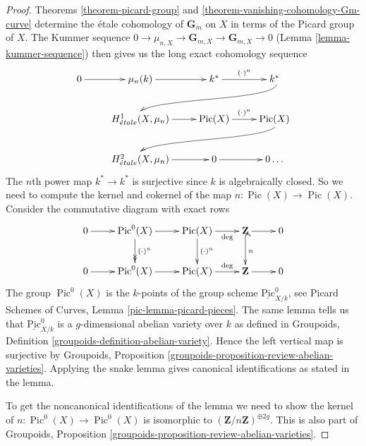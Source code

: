 \documentclass[10pt,a4paper]{amsart}
\theoremstyle{plain}
\theoremstyle{definition}
\theoremstyle{remark}
\numberwithin{equation}{subsection}
\def\etale{{\acute{e}tale}}
\def\Pic{\mathop{\mathrm{Pic}}\nolimits}
\def\Picardfunctor{\mathrm{Pic}}
\begin{document}
\begin{proof}
Theorems \ref{theorem-picard-group} and
\ref{theorem-vanishing-cohomology-Gm-curve}
determine the \'etale cohomology of $\mathbf{G}_m$ on $X$
in terms of the Picard group of $X$.
The Kummer sequence $0\to \mu_{n, X} \to \mathbf{G}_{m, X}
\to \mathbf{G}_{m, X}\to 0$ (Lemma \ref{lemma-kummer-sequence})
then gives us the long exact cohomology sequence
$$
\xymatrix{
0 \ar[r] & \mu_n(k) \ar[r] &
k^* \ar[r]^{(\cdot)^n} &
k^* \ar@(rd, ul)[rdllllr] \\
& H_\etale^1(X, \mu_n) \ar[r] &
\Pic(X) \ar[r]^{(\cdot)^n} &
\Pic(X) \ar@(rd, ul)[rdllllr] \\
& H_\etale^2(X, \mu_n) \ar[r] & 0 \ar[r] & 0 \ldots
}
$$
The $n$th power map $k^* \to k^*$ is surjective since $k$ is algebraically
closed. So we need to compute the kernel and cokernel of the map
$n : \Pic(X) \to \Pic(X)$. Consider the commutative diagram with
exact rows
$$
\xymatrix{
0 \ar[r] &
\Pic^0(X) \ar[r] \ar@{>>}[d]^{(\cdot)^n} &
\Pic(X) \ar[r]_-\deg \ar[d]^{(\cdot)^n} &
\mathbf{Z} \ar[r] \ar@{^{(}->}[d]^n & 0 \\
0 \ar[r] &
\Pic^0(X) \ar[r] &
\Pic(X) \ar[r]^-\deg &
\mathbf{Z} \ar[r] & 0
}
$$
The group $\Pic^0(X)$ is the $k$-points of
the group scheme $\underline{\Picardfunctor}^0_{X/k}$, see
Picard Schemes of Curves, Lemma \ref{pic-lemma-picard-pieces}.
The same lemma tells us that $\underline{\Picardfunctor}^0_{X/k}$
is a $g$-dimensional abelian variety over $k$ as defined in
Groupoids, Definition \ref{groupoids-definition-abelian-variety}.
Hence the left vertical map is surjective by
Groupoids, Proposition \ref{groupoids-proposition-review-abelian-varieties}.
Applying the snake lemma gives canonical identifications as stated
in the lemma.

\medskip\noindent
To get the noncanonical identifications of the lemma we need to
show the kernel of $n : \Pic^0(X) \to \Pic^0(X)$
is isomorphic to $(\mathbf{Z}/n\mathbf{Z})^{\oplus 2g}$.
This is also part of Groupoids, Proposition
\ref{groupoids-proposition-review-abelian-varieties}.
\end{proof}
\end{document}

